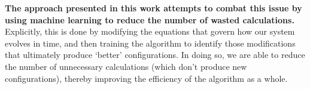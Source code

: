 \begin{doublespace}
\textbf{The approach presented in this work attempts to combat this issue by
using machine learning to reduce the number of wasted calculations.}
%
Explicitly, this is done by modifying the equations that govern how our system
evolves in time, and then training the algorithm to identify those
modifications that ultimately produce `better' configurations.
%
In doing so, we are able to reduce the number of unnecessary calculations
(which don't produce new configurations), thereby improving the efficiency of
the algorithm as a whole.
%
%

\end{doublespace}
